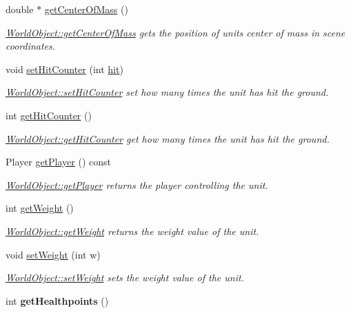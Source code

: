 \begin{DoxyCompactItemize}
double $\ast$ \hyperlink{class_world_object_adec5084311ea0477db37e9bbeddeb401}{get\+Center\+Of\+Mass} ()
\begin{DoxyCompactList}\small\item\em \hyperlink{class_world_object_adec5084311ea0477db37e9bbeddeb401}{World\+Object\+::get\+Center\+Of\+Mass} gets the position of units center of mass in scene coordinates. \end{DoxyCompactList}\item 
void \hyperlink{class_world_object_aae9c6fd3df711b5e0df44ad1e6fcabab}{set\+Hit\+Counter} (int \hyperlink{class_world_object_a5630a513886f232da0174fc992a13ad7}{hit})
\begin{DoxyCompactList}\small\item\em \hyperlink{class_world_object_aae9c6fd3df711b5e0df44ad1e6fcabab}{World\+Object\+::set\+Hit\+Counter} set how many times the unit has hit the ground. \end{DoxyCompactList}\item 
int \hyperlink{class_world_object_a22888de0c352adf646e4c87584efe39c}{get\+Hit\+Counter} ()
\begin{DoxyCompactList}\small\item\em \hyperlink{class_world_object_a22888de0c352adf646e4c87584efe39c}{World\+Object\+::get\+Hit\+Counter} get how many times the unit has hit the ground. \end{DoxyCompactList}\item 
Player \hyperlink{class_world_object_ac3ff724096106165c68e3e9600032233}{get\+Player} () const 
\begin{DoxyCompactList}\small\item\em \hyperlink{class_world_object_ac3ff724096106165c68e3e9600032233}{World\+Object\+::get\+Player} returns the player controlling the unit. \end{DoxyCompactList}\item 
int \hyperlink{class_world_object_a8061ac1f99f6ed3f78d42a39cb82d0c2}{get\+Weight} ()
\begin{DoxyCompactList}\small\item\em \hyperlink{class_world_object_a8061ac1f99f6ed3f78d42a39cb82d0c2}{World\+Object\+::get\+Weight} returns the weight value of the unit. \end{DoxyCompactList}\item 
void \hyperlink{class_world_object_a39b88d87246ad4d526d6b7c54aeb7e82}{set\+Weight} (int w)
\begin{DoxyCompactList}\small\item\em \hyperlink{class_world_object_a39b88d87246ad4d526d6b7c54aeb7e82}{World\+Object\+::set\+Weight} sets the weight value of the unit. \end{DoxyCompactList}\item 
int {\bfseries get\+Healthpoints} ()\hypertarget{class_world_object_ac6f9accf985f4f67f1219ad0196a5096}{}\label{class_world_object_ac6f9accf985f4f67f1219ad0196a5096}


\end{DoxyCompactItemize}
